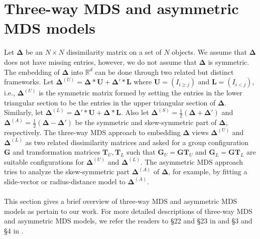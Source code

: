 \section{Three-way MDS and asymmetric MDS models}
\label{sec:three-way-mds}
Let $\bm{\Delta}$ be an $N \times N$ dissimilarity matrix on a set of
$N$ objects. We assume that $\bm{\Delta}$ does not have missing
entries, however, we do not assume that $\bm{\Delta}$ is
symmetric. The embedding of $\bm{\Delta}$ into $\mathbb{R}^{d}$ can be
done through two related but distinct frameworks. Let
$\bm{\Delta}^{(U)} = \bm{\Delta} \ast \mathbf{U} + \bm{\Delta}' \ast
\mathbf{L}$ where $\mathbf{U} = (I_{i \geq j})$ and $\mathbf{L} =
(I_{i < j})$, i.e., $\bm{\Delta}^{(U)}$ is the symmetric matrix formed
by setting the entries in the lower triangular section to be the
entries in the upper triangular section of $\bm{\Delta}$. Similarly,
let $\bm{\Delta}^{(L)} = \bm{\Delta}' \ast \mathbf{U} + \bm{\Delta}
\ast \mathbf{L}$. Also let $\bm{\Delta}^{(S)} =
\tfrac{1}{2}(\bm{\Delta} + \bm{\Delta}')$ and $\bm{\Delta}^{(A)} =
\tfrac{1}{2}(\bm{\Delta} - \bm{\Delta}')$ be the symmetric and
skew-symmetric part of $\bm{\Delta}$, respectively. The three-way MDS
approach to embedding $\bm{\Delta}$ views $\bm{\Delta}^{(U)}$ and
$\bm{\Delta}^{(L)}$ as two related dissimilarity matrices and asked
for a group configuration $\mathbf{G}$ and transformation matrices
$\mathbf{T}_{U}, \mathbf{T}_L$ such that $\mathbf{G}_U = \mathbf{G}
\mathbf{T}_U$ and $\mathbf{G}_L = \mathbf{G} \mathbf{T}_L$ are
suitable configurations for $\bm{\Delta}^{(U)}$ and
$\bm{\Delta}^{(L)}$. The asymmetric MDS approach tries to analyze the
skew-symmetric part $\bm{\Delta}^{(A)}$ of $\bm{\Delta}$, for example,
by fitting a slide-vector or radius-distance model to
$\bm{\Delta}^{(A)}$. \\ \\
%
%
\noindent
This section gives a brief overview of three-way MDS and asymmetric
MDS models as pertain to our work. For more detailed descriptions of
three-way MDS and asymmetric MDS models, we refer the readers to \S 22
and \S 23 in \citet{borg05:_moder} and \S 3 and \S 4 in
\citet{saito05:_data_analy_asymm_struc}.
%
%
